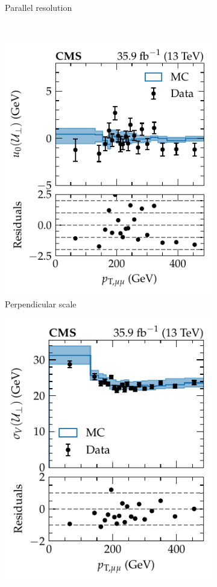 \begin{figure}[htb]
\begin{subfigure}[b]{0.49\textwidth}
        \caption{Parallel resolution}
        \label{subfigb:recoil-calib-ptllbins-mm}
    \end{subfigure}
    \\
    \begin{subfigure}[b]{0.49\textwidth}
        \centering
        \includegraphics{chapters/041_corrections/images/ptmiss_calib/metres_mm_u0_perp.pdf}
        \caption{Perpendicular scale}
        \label{subfigc:recoil-calib-ptllbins-mm}
    \end{subfigure}
    \hfill
    \begin{subfigure}[b]{0.49\textwidth}
        \centering
        \includegraphics{chapters/041_corrections/images/ptmiss_calib/metres_mm_sigmav_perp.pdf}

\end{subfigure}
\end{figure}
